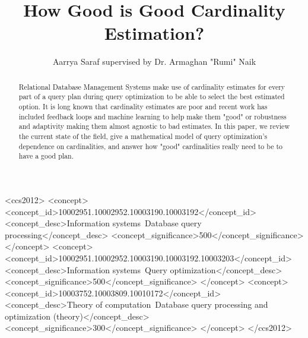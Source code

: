 \documentclass[sigconf,nonacm]{acmart}
\begin{document}
\title{How Good is Good Cardinality Estimation?}

\author{Aarrya Saraf supervised by Dr. Armaghan "Rumi" Naik}


\renewcommand{\shortauthors}{Saraf and Naik}

\begin{abstract}
Relational Database Management Systems make use of cardinality estimates for every part of a query plan during query optimization to be able to select the best estimated option. It is long known that cardinality estimates are poor and recent work has included feedback loops and machine learning to help make them "good" or robustness and adaptivity making them almost agnostic to bad estimates. In this paper, we review the current state of the field, give a mathematical model of query optimization's dependence on cardinalities, and answer how "good" cardinalities really need to be to have a good plan. 
\end{abstract}

\begin{CCSXML}
<ccs2012>
<concept>
<concept_id>10002951.10002952.10003190.10003192</concept_id>
<concept_desc>Information systems~Database query processing</concept_desc>
<concept_significance>500</concept_significance>
</concept>
<concept>
<concept_id>10002951.10002952.10003190.10003192.10003203</concept_id>
<concept_desc>Information systems~Query optimization</concept_desc>
<concept_significance>500</concept_significance>
</concept>
<concept>
<concept_id>10003752.10003809.10010172</concept_id>
<concept_desc>Theory of computation~Database query processing and optimization (theory)</concept_desc>
<concept_significance>300</concept_significance>
</concept>
</ccs2012>
\end{CCSXML}



\maketitle
\end{document}
